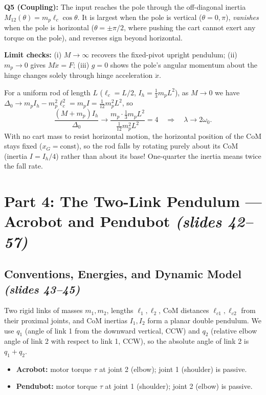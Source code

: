 \documentclass[11pt, a4paper]{article}
\theoremstyle{definition}
\theoremstyle{plain}
\begin{document}
\textbf{Q5 (Coupling):} The input reaches the pole through the off-diagonal inertia $M_{12}(\theta) = m_p \ell_c \cos\theta$. It is largest when the pole is vertical ($\theta = 0, \pi$), \emph{vanishes} when the pole is horizontal ($\theta = \pm\pi/2$, where pushing the cart cannot exert any torque on the pole), and reverses sign beyond horizontal.

\textbf{Limit checks:} (i) $M \to \infty$ recovers the fixed-pivot upright pendulum; (ii) $m_p \to 0$ gives $M\ddot{x} = F$; (iii) $g = 0$ shows the pole's angular momentum about the hinge changes solely through hinge acceleration $\ddot{x}$.

\begin{intuition}
For a uniform rod of length $L$ ($\ell_c = L/2$, $I_h = \frac{1}{3}m_p L^2$), as $M \to 0$ we have $\Delta_0 \to m_p I_h - m_p^2 \ell_c^2 = m_p I = \frac{1}{12}m_p^2 L^2$, so
\[
  \frac{(M + m_p) I_h}{\Delta_0} \longrightarrow \frac{m_p \cdot \frac{1}{3}m_p L^2}{\frac{1}{12}m_p^2 L^2} = 4
  \quad\Longrightarrow\quad
  \lambda \longrightarrow 2\omega_0.
\]
With no cart mass to resist horizontal motion, the horizontal position of the CoM stays fixed ($x_G = \text{const}$), so the rod falls by rotating purely about its CoM (inertia $I = I_h / 4$) rather than about its base! One-quarter the inertia means twice the fall rate.
\end{intuition}

\section{Part 4: The Two-Link Pendulum --- Acrobot and Pendubot \emph{(slides 42--57)}}

\subsection{Conventions, Energies, and Dynamic Model \emph{(slides 43--45)}}

Two rigid links of masses $m_1, m_2$, lengths $\ell_1, \ell_2$, CoM distances $\ell_{c1}, \ell_{c2}$ from their proximal joints, and CoM inertias $I_1, I_2$ form a planar double pendulum. We use $q_1$ (angle of link 1 from the downward vertical, CCW) and $q_2$ (relative elbow angle of link 2 with respect to link 1, CCW), so the absolute angle of link 2 is $q_1 + q_2$.
\begin{itemize}
  \item \textbf{Acrobot:} motor torque $\tau$ at joint 2 (elbow); joint 1 (shoulder) is passive.
  \item \textbf{Pendubot:} motor torque $\tau$ at joint 1 (shoulder); joint 2 (elbow) is passive.
\end{itemize}
\end{document}

